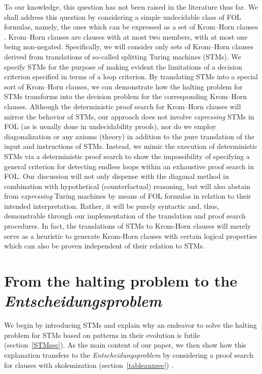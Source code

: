 \documentclass[%
  manuscript=article,   %
  year=2024,
  volume=77,
  doi=00000.000,
]{zfn}
\begin{document}
To our knowledge, this question has not been raised in the literature thus far. We shall address this question by considering a simple undecidable class of FOL formulas, namely, the ones which can be expressed as a set of Krom--Horn clauses%
. Krom--Horn clauses are clauses with at most two members, with at most one being non-negated. Specifically, we will consider only sets of Krom--Horn clauses derived from translations of so-called splitting Turing machines (STMs). We specify STMs for the purpose of making evident the limitations of a decision criterion specified in terms of a loop criterion. By translating STMs into a special sort of Krom--Horn clauses, we can demonstrate how the halting problem for STMs transforms into the decision problem for the corresponding Krom--Horn clauses. Although the deterministic proof search for Krom--Horn clauses %
will mirror the behavior of STMs, our approach does not involve \emph{expressing}
STMs in FOL (as is usually done in undecidability proofs), nor do we employ diagonalization or any axioms (theory) in addition to the pure translation of the input and instructions of STMs.
Instead, we mimic the execution of deterministic STMs via a deterministic proof search to show the impossibility of specifying a general criterion for detecting endless loops within an exhaustive proof search in FOL. Our discussion will not only dispense with the diagonal method in combination with hypothetical (counterfactual) reasoning, but will also abstain from \emph{expressing} Turing machines by means of FOL formulas in relation to their intended interpretation. Rather, it will be purely syntactic and, thus, demonstrable through our implementation of the translation and proof search procedures. In fact, the translations of STMs to Krom-Horn clauses will merely serve as a heuristic to generate Krom-Horn clauses with certain logical properties which can also be proven independent of their relation to STMs.


\section{From the halting problem to the \textit{Ent\-schei\-dungs\-problem}}\label{results}

We begin by introducing STMs and explain why an endeavor to solve the halting problem for STMs based on patterns in their evolution is futile (section~\ref{STMsec}). As the main content of our paper, we
then show how this explanation transfers to the \emph{Entscheidungsproblem} by considering a proof search for clauses with skolemization (section~\ref{tableauxsec})%
.
\end{document}
